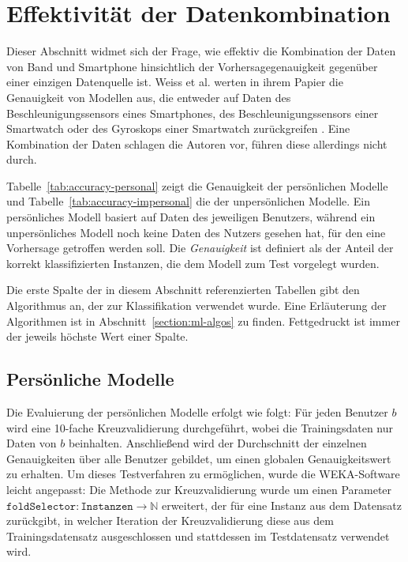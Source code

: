 \section{Effektivität der Datenkombination}
\label{sec:combination-effect}
Dieser Abschnitt widmet sich der Frage, wie effektiv die Kombination der Daten von Band und Smartphone hinsichtlich der Vorhersagegenauigkeit gegenüber einer einzigen Datenquelle ist. Weiss et al. werten in ihrem Papier die Genauigkeit von Modellen aus, die entweder auf Daten des Beschleunigungssensors eines Smartphones, des Beschleunigungssensors einer Smartwatch oder des Gyroskops einer Smartwatch zurückgreifen \cite{Weiss2016}. Eine Kombination der Daten schlagen die Autoren vor, führen diese allerdings nicht durch.

Tabelle~\ref{tab:accuracy-personal} zeigt die Genauigkeit der persönlichen Modelle und Tabelle~\ref{tab:accuracy-impersonal} die der unpersönlichen Modelle. Ein persönliches Modell basiert auf Daten des jeweiligen Benutzers, während ein unpersönliches Modell noch keine Daten des Nutzers gesehen hat, für den eine Vorhersage getroffen werden soll. Die \textit{Genauigkeit} ist definiert als der Anteil der korrekt klassifizierten Instanzen, die dem Modell zum Test vorgelegt wurden.

Die erste Spalte der in diesem Abschnitt referenzierten Tabellen gibt den Algorithmus an, der zur Klassifikation verwendet wurde. Eine Erläuterung der Algorithmen ist in Abschnitt~\ref{section:ml-algos}
zu finden. Fettgedruckt ist immer der jeweils höchste Wert einer Spalte.

\subsection{Persönliche Modelle}

Die Evaluierung der persönlichen Modelle erfolgt wie folgt: Für jeden Benutzer $b$ wird eine 10-fache Kreuzvalidierung durchgeführt, wobei die Trainingsdaten nur Daten von $b$ beinhalten. Anschließend wird der Durchschnitt der einzelnen Genauigkeiten über alle Benutzer gebildet, um einen globalen Genauigkeitswert zu erhalten. Um dieses Testverfahren zu ermöglichen, wurde die WEKA-Software leicht angepasst: Die Methode zur Kreuzvalidierung wurde um einen Parameter $\texttt{foldSelector}: \texttt{Instanzen} \to \mathbb{N}$ erweitert, der für eine Instanz aus dem Datensatz zurückgibt, in welcher Iteration der Kreuzvalidierung diese aus dem Trainingsdatensatz ausgeschlossen und stattdessen im Testdatensatz verwendet wird.

